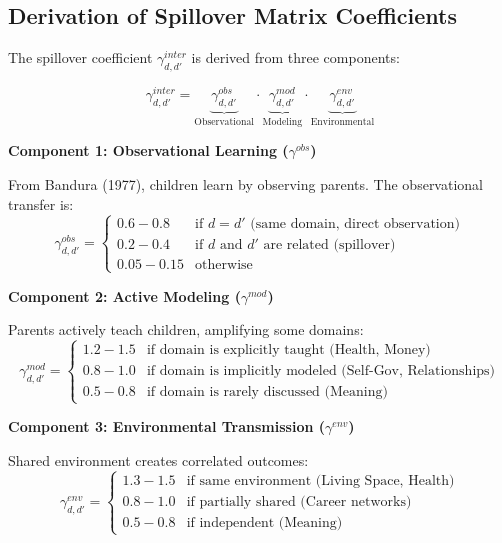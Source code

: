 \subsection{Derivation of Spillover Matrix Coefficients}

The spillover coefficient $\gamma^{inter}_{d,d'}$ is derived from three components:

\begin{equation}
\gamma^{inter}_{d,d'} = \underbrace{\gamma^{obs}_{d,d'}}_{\text{Observational}} \cdot \underbrace{\gamma^{mod}_{d,d'}}_{\text{Modeling}} \cdot \underbrace{\gamma^{env}_{d,d'}}_{\text{Environmental}}
\label{eq:bi-spillover-decomp}
\end{equation}

\textbf{Component 1: Observational Learning ($\gamma^{obs}$)}

From Bandura (1977), children learn by observing parents. The observational transfer is:
\begin{equation}
\gamma^{obs}_{d,d'} = \begin{cases}
0.6-0.8 & \text{if } d = d' \text{ (same domain, direct observation)} \\
0.2-0.4 & \text{if } d \text{ and } d' \text{ are related (spillover)} \\
0.05-0.15 & \text{otherwise}
\end{cases}
\end{equation}

\textbf{Component 2: Active Modeling ($\gamma^{mod}$)}

Parents actively teach children, amplifying some domains:
\begin{equation}
\gamma^{mod}_{d,d'} = \begin{cases}
1.2-1.5 & \text{if domain is explicitly taught (Health, Money)} \\
0.8-1.0 & \text{if domain is implicitly modeled (Self-Gov, Relationships)} \\
0.5-0.8 & \text{if domain is rarely discussed (Meaning)}
\end{cases}
\end{equation}

\textbf{Component 3: Environmental Transmission ($\gamma^{env}$)}

Shared environment creates correlated outcomes:
\begin{equation}
\gamma^{env}_{d,d'} = \begin{cases}
1.3-1.5 & \text{if same environment (Living Space, Health)} \\
0.8-1.0 & \text{if partially shared (Career networks)} \\
0.5-0.8 & \text{if independent (Meaning)}
\end{cases}
\end{equation}

